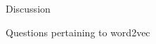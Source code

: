 \documentclass{article} %
\begin{document}
\begin{section}{Discussion}
\begin{subsection}{Questions pertaining to word2vec}

\end{subsection}

\end{section}

\clearpage
\footnotesize


\end{document}
